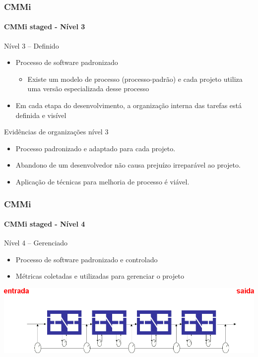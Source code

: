 \begin{frame}
	\frametitle{CMMi}
	\framesubtitle{CMMi staged - Nível 3}
	
	\begin{block:fact}{Nível 3 -- Definido}
		\begin{itemize}
			\item Processo de software padronizado
			\begin{itemize}
				\item Existe um modelo de processo (processo-padrão) e cada projeto
				utiliza uma versão especializada desse processo
			\end{itemize}
			\item Em cada etapa do desenvolvimento, a organização interna das tarefas
			está definida e visível
		\end{itemize}
	\end{block:fact}
	
	\begin{block:fact}{Evidências de organizações nível 3}
		\begin{itemize}
			\item Processo padronizado e adaptado para cada projeto.
			\item Abandono de um desenvolvedor não causa prejuízo irreparável ao projeto.
			\item Aplicação de técnicas para melhoria de processo é viável.
		\end{itemize}
	\end{block:fact}
\end{frame}

\begin{frame}
	\frametitle{CMMi}
	\framesubtitle{CMMi staged - Nível 4}
	
	\begin{block:fact}{Nível 4 -- Gerenciado}
		\begin{itemize}
			\item Processo de software padronizado e controlado
			\item Métricas coletadas e utilizadas para gerenciar o projeto
		\end{itemize}
	\end{block:fact}
	
	\begin{block:fact}{}
		\centering
		\includegraphics[width=\textwidth]{software-engineering/project-management/process/process-quality/cmmi/cmmi-staged-4}
	\end{block:fact}
\end{frame}


